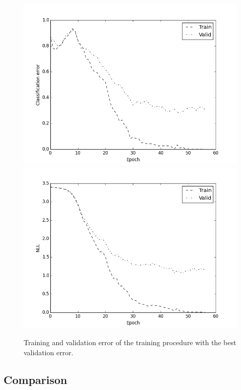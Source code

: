 \begin{figure}[htbf]
\label{fig:results_bestrun}
\includegraphics[scale=0.35]{result1.png} 
\includegraphics[scale=0.35]{result2.png} 
\caption{Training and validation error of the training procedure with the best validation error.}
\end{figure}

\subsection{Comparison}